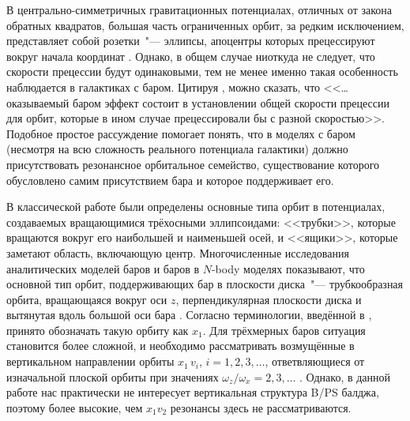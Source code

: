 \documentclass[tikz]{trlnotes}
\begin{document}
\newlength{\imageheight}
\imageheight=5.5cm
В центрально-симметричных гравитационных потенциалах, отличных от закона обратных квадратов, большая часть ограниченных орбит, за редким исключением, представляет собой розетки~"--- эллипсы, апоцентры которых прецессируют вокруг начала координат \citep{book:14857}. Однако, в общем случае ниоткуда не следует, что скорости прецессии будут одинаковыми, тем не менее именно такая особенность наблюдается в галактиках с баром.
Цитируя \cite{sellwood2014a}, можно сказать, что <<\ldots оказываемый баром эффект состоит в установлении общей скорости
прецессии для орбит, которые в ином случае прецессировали бы с разной скоростью>>.
Подобное простое рассуждение помогает понять, что в моделях с баром (несмотря на всю сложность реального потенциала галактики)
должно присутствовать резонансное орбитальное семейство, существование которого обусловлено самим присутствием бара и которое поддерживает его.

В классической работе \citet{dezeeuw1985} были определены основные типа орбит в потенциалах, создаваемых вращающимися трёхосными
эллипсоидами: <<трубки>>, которые вращаются вокруг его наибольшей и наименьшей осей, и <<ящики>>, которые заметают область, включающую центр.  Многочисленные исследования аналитических моделей баров и баров в $N$-body моделях показывают, что основной тип орбит, поддерживающих бар в плоскости диска~"--- трубкообразная орбита, вращающаяся вокруг оси $z$, перпендикулярная плоскости диска и вытянутая вдоль большой оси бара \citep{athanassoula2003}. Согласно терминологии, введённой в \citet{contopoulos1980a}, принято обозначать такую
орбиту как $x_1$. Для трёхмерных баров ситуация становится более сложной, и необходимо рассматривать возмущённые в
вертикальном направлении орбиты $x_1\,v_i$, $i=1,2,3, \dotsc$,
ответвляющиеся от изначальной плоской орбиты при значениях 
$ω_z/ω_x = 2,3, \dotsc$ \citep{skokos2002a,pfenniger1991}. Однако, в данной работе нас практически не интересует
вертикальная структура B/PS балджа, поэтому более высокие, чем $x_1v_2$ резонансы здесь не рассматриваются.
\end{document}
